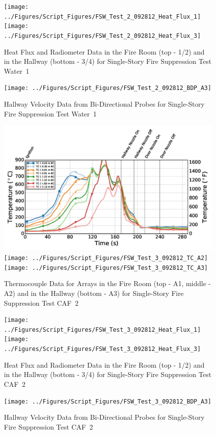 \documentclass[12pt,oneside]{book}
\begin{document}
\begin{figure}[ht]
\texttt{[image: ../Figures/Script\_Figures/FSW\_Test\_2\_092812\_Heat\_Flux\_1]}
\texttt{[image: ../Figures/Script\_Figures/FSW\_Test\_2\_092812\_Heat\_Flux\_3]}
\caption{Heat Flux and Radiometer Data in the Fire Room (top - 1/2) and in the Hallway (bottom - 3/4) for Single-Story Fire Suppression Test Water~1}
\end{figure}

\begin{figure}[ht]
\texttt{[image: ../Figures/Script\_Figures/FSW\_Test\_2\_092812\_BDP\_A3]}
\caption{Hallway Velocity Data from Bi-Directional Probes for Single-Story Fire Suppression Test Water~1}
\end{figure}

\begin{figure}[ht]
\includegraphics[width=.725\columnwidth]{../Figures/Script_Figures/FSW_Test_3_092812_TC_A1}
\texttt{[image: ../Figures/Script\_Figures/FSW\_Test\_3\_092812\_TC\_A2]}
\texttt{[image: ../Figures/Script\_Figures/FSW\_Test\_3\_092812\_TC\_A3]}
\caption{Thermocouple Data for Arrays in the Fire Room (top - A1, middle - A2) and in the Hallway (bottom - A3) for Single-Story Fire Suppression Test CAF~2}
\end{figure}

\begin{figure}[ht]
\texttt{[image: ../Figures/Script\_Figures/FSW\_Test\_3\_092812\_Heat\_Flux\_1]}
\texttt{[image: ../Figures/Script\_Figures/FSW\_Test\_3\_092812\_Heat\_Flux\_3]}
\caption{Heat Flux and Radiometer Data in the Fire Room (top - 1/2) and in the Hallway (bottom - 3/4) for Single-Story Fire Suppression Test CAF~2}
\end{figure}

\begin{figure}[ht]
\texttt{[image: ../Figures/Script\_Figures/FSW\_Test\_3\_092812\_BDP\_A3]}
\caption{Hallway Velocity Data from Bi-Directional Probes for Single-Story Fire Suppression Test CAF~2}
\end{figure}
\end{document}
